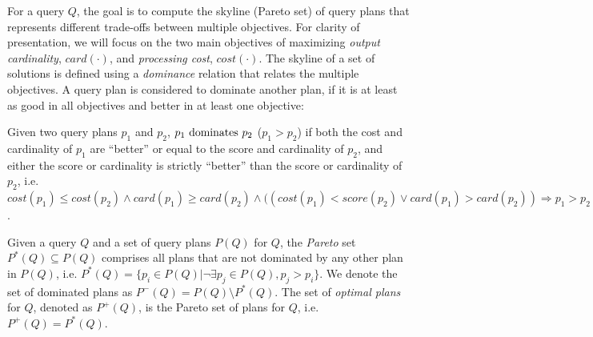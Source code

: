 For a query $Q$, %
the goal is to compute the skyline (Pareto set) of query plans that represents different trade-offs between multiple objectives. For clarity of presentation, we will focus on the two main objectives of maximizing \emph{output cardinality}, $card(\cdot)$, and \emph{processing cost}, $cost(\cdot)$. 
The skyline of a set of solutions is defined using a \emph{dominance}
relation that relates the multiple objectives. A query plan is considered to dominate another plan, if it is at least as good in all objectives and better in at least one objective:

\begin{definition}[Dominance]
  Given two query plans $p_1$ and $p_2$, $p_1 \mbox{ \textnormal{dominates}
  } p_2$ ($p_1 > p_2$) if both the cost and cardinality of $p_1$ are ``better'' or equal
  to the score and cardinality of $p_2$, and either the score or
  cardinality is strictly ``better'' than the score or cardinality of
  $p_2$, i.e. $cost(p_1) \leq cost(p_2) \wedge card(p_1) \geq
  card(p_2) \wedge ((cost(p_1) < score(p_2) \vee card(p_1) >
  card(p_2)) \Rightarrow p_1 > p_2$.
\end{definition}


\begin{definition}
  Given a query $Q$ and a set of query plans $P(Q)$ for $Q$, the \emph{Pareto}
  set $P^*(Q) \subseteq P(Q)$ comprises all plans that are not
  dominated by any other plan in $P(Q)$, i.e. $P^*(Q) = \{p_i \in P(Q) | \neg\exists p_j\in P(Q), p_j  > p_i\}$. We denote the set of
  dominated plans as $P^-(Q) = P(Q) \setminus P^*(Q)$. The set of \emph{optimal plans} for $Q$, denoted as $P^+(Q)$, is the Pareto set of plans for $Q$, i.e. $P^+(Q) = P^*(Q)$.
\end{definition}


